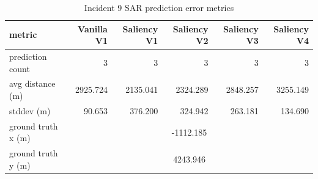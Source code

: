 \begin{table}[ht]
\centering
\caption{Incident 9 SAR prediction error metrics}
\label{tab:sar-incident-9}
\begin{tabular}{lrrrrr}
\hline
metric & Vanilla V1 & Saliency V1 & Saliency V2 & Saliency V3 & Saliency V4 \\
\hline
prediction count & 3 & 3 & 3 & 3 & 3 \\
avg distance (m) & 2925.724 & 2135.041 & 2324.289 & 2848.257 & 3255.149 \\
stddev (m) & 90.653 & 376.200 & 324.942 & 263.181 & 134.690 \\
ground truth x (m) & \multicolumn{5}{c}{-1112.185} \\
ground truth y (m) & \multicolumn{5}{c}{4243.946} \\
\hline
\end{tabular}
\end{table}
